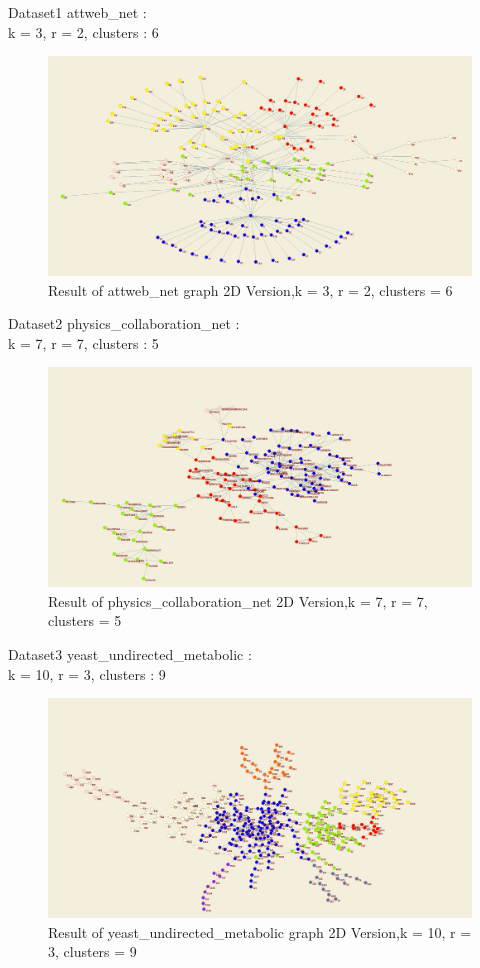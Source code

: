 \documentclass[paper=letter, fontsize=11pt]{article}
\numberwithin{equation}{section}		%
\numberwithin{figure}{section}			%
\numberwithin{table}{section}				%
\begin{document}
\noindent Dataset1 attweb\_net :\\
k = 3, r = 2, clusters : 6\\
\begin{figure}[H]
	\centering
	\includegraphics[width=1\textwidth]{attweb_net_6.jpg}
	\caption{Result of attweb\_net graph 2D Version,k = 3, r = 2, clusters = 6}
\end{figure}

\noindent Dataset2 physics\_collaboration\_net :\\
k = 7, r = 7, clusters : 5\\
\begin{figure}[H]
	\centering
	\includegraphics[width=1\textwidth]{physics_c5_k7_r7.jpg}
	\caption{Result of physics\_collaboration\_net 2D Version,k = 7, r = 7, clusters = 5}
\end{figure}
\noindent Dataset3 yeast\_undirected\_metabolic :\\
k = 10, r = 3, clusters : 9\\
\begin{figure}[H]
	\centering
	\includegraphics[width=1\textwidth]{yeast_c9_k10_r3.jpg}
	\caption{Result of yeast\_undirected\_metabolic graph 2D Version,k = 10, r = 3, clusters = 9}
\end{figure}
\end{document}
